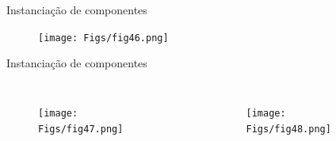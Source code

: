 \documentclass[aspectratio=169]{beamer}
\begin{document}
\begin{frame}{Instanciação de componentes}
	\justifying
	
	
	\begin{figure}[h]
	\centering
	\texttt{[image: Figs/fig46.png]}
	\end{figure}
	
\end{frame}

\begin{frame}{Instanciação de componentes}
	\justifying
	
	\begin{columns}
		
		\begin{figure}[h]
			\centering
			\texttt{[image: Figs/fig47.png]}
		\end{figure}
		
		\begin{figure}[h]
			\centering
			\texttt{[image: Figs/fig48.png]}
		\end{figure}
	\end{columns}
	
	
\end{frame}
\end{document}
